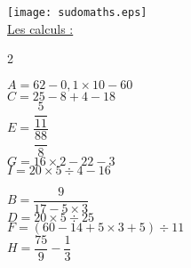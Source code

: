 \documentclass[a4paper,11pt]{article}
\newcommand{\bmul}[1]{\begin{multicols}{#1}}
\newcommand{\emul}{\end{multicols}}
\begin{document}
\texttt{[image: sudomaths.eps]}\\

\underline{Les calculs :}

\bmul{2}

$A = 62 -0,1 \times 10-60$ \\

$C = 25-8+4-18 $\\

$E =\dfrac{\dfrac{5}{11}}{\dfrac{88}{8}}$\\

$G = 16 \times 2-22-3$\\

$I = 20 \times 5 \div 4 -16$

\columnbreak

$B = \dfrac{9}{17-5 \times 3}	$\\


$D =	20 \times5 \div 25 $\\
	 
	 $F =	(60-14+5 \times 3 +5)\div 11 $\\
	 
	 $H = \dfrac{75}{9}- \dfrac{1}{3}$\\
	 
	 \emul
	 
	 
\end{document}
